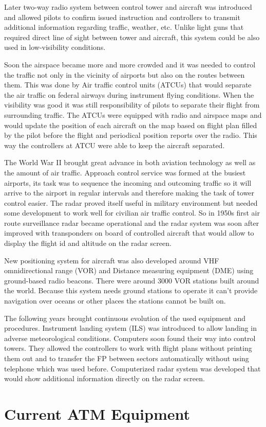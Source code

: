 Later two-way radio system between control tower and aircraft was introduced and allowed pilots to confirm issued instruction and controllers to transmit additional information regarding traffic, weather, etc. Unlike light guns that required direct line of sight between tower and aircraft, this system could be also used in low-visibility conditions.

Soon the airspace became more and more crowded and it was needed to control the traffic not only in the vicinity of airports but also on the routes between them. This was done by Air traffic control units (ATCUs) that would separate the air traffic on federal airways during instrument flying conditions. When the visibility was good it was still responsibility of pilots to separate their flight from surrounding traffic. The ATCUs were equipped with radio and airspace maps and would update the position of each aircraft on the map based on flight plan filled by the pilot before the flight and periodical position reports over the radio. This way the controllers at ATCU were able to keep the aircraft separated.

The World War II brought great advance in both aviation technology as well as the amount of air traffic. Approach control service was formed at the busiest airports, its task was to sequence the incoming and outcoming traffic so it will arrive to the airport in regular intervals and therefore making the task of tower control easier. The radar proved itself useful in military environment but needed some development to work well for civilian air traffic control. So in 1950s first air route surveillance radar became operational and the radar system was soon after improved with transponders on board of controlled aircraft that would allow to display the flight id and altitude on the radar screen.

New positioning system for aircraft was also developed around VHF omnidirectional range (VOR) and Distance measuring equipment (DME) using ground-based radio beacons. There were around 3000 VOR stations built around the world. \cite{vor} Because this system needs ground stations to operate it can't provide navigation over oceans or other places the stations cannot be built on.

The following years brought continuous evolution of the used equipment and procedures. Instrument landing system (ILS) was introduced to allow landing in adverse meteorological conditions. Computers soon found their way into control towers. They allowed the controllers to work with flight plans without printing them out and to transfer the FP between sectors automatically without using telephone which was used before. Computerized radar system was developed that would show additional information directly on the radar screen.

\section{Current ATM Equipment}


